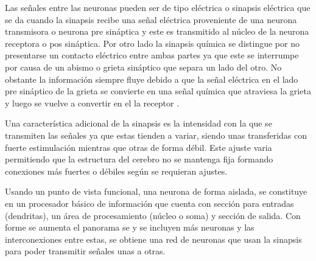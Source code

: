 		Las se\~{n}ales entre las neuronas pueden ser de tipo el\'{e}ctrica o sinapsis
	el\'{e}ctrica que se da cuando la sinapsis recibe una se\~{n}al el\'{e}ctrica proveniente
	de una neurona transmisora o neurona pre sin\'{a}ptica y este es transmitido al
	n\'{u}cleo de la neurona receptora o pos sin\'{a}ptica. Por otro lado la
	sinapsis qu\'{i}mica se distingue por no presentarse un contacto el\'{e}ctrico
	entre ambas partes ya que este se interrumpe por causa de un abismo o grieta sin\'{a}ptico que separa un lado del otro. No obstante la informaci\'{o}n siempre fluye debido a que la se\~{n}al el\'{e}ctrica en el lado pre sin\'{a}ptico de la grieta se convierte en una se\~{n}al qu\'{i}mica que atraviesa la grieta y luego se vuelve a convertir en el la receptor \cite{Kriesel2005}.
 	
 		Una caracter\'{i}stica adicional de la sinapsis es la intensidad con la que se
 	transmiten las se\~{n}ales ya que estas tienden a variar, siendo unas transferidas
 	con fuerte estimulaci\'{o}n mientras que otras de forma d\'{e}bil. Este ajuste varia
 	permitiendo que la estructura del cerebro no se mantenga fija formando conexiones m\'{a}s fuertes o d\'{e}biles seg\'{u}n se requieran ajustes.

 		Usando un punto de vista funcional, una neurona de forma aislada, se
 	constituye en un procesador b\'{a}sico de informaci\'{o}n que cuenta con secci\'{o}n para
 	entradas (dendritas), un \'{a}rea de procesamiento (n\'{u}cleo o soma) y secci\'{o}n de
 	salida. Con forme se aumenta el panorama se y se incluyen m\'{a}s neuronas y las interconexiones entre estas, se obtiene una red de neuronas que usan la sinapsis para poder transmitir se\~{n}ales unas a otras.
 		
 		
